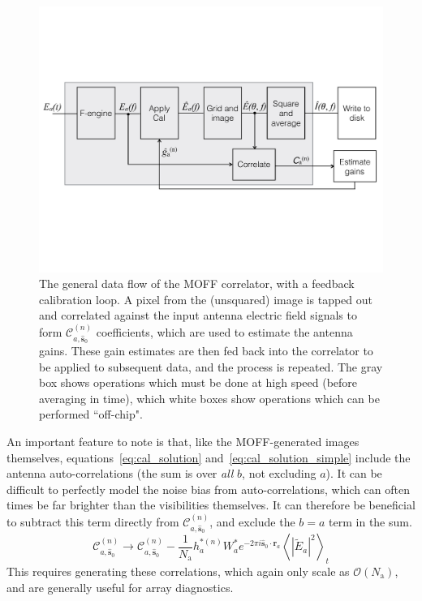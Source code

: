 \documentclass[a4paper,fleqn,usenatbib]{../mnras}
\newcommand{\Nant}{\ensuremath{N_{\mathrm{a}}}}
\newcommand{\spix}{\ensuremath{\hat{\mathbf{s}}_{0}}}
\newcommand{\Cna}[1][n]{\ensuremath{\mathcal{C}^{(#1)}_{a,\spix}}}
\newcommand{\ra}{\ensuremath{\mathbf{r}_a}}
\newcommand{\beamtheta}{\ensuremath{W}}
\newcommand{\Er}[1]{\ensuremath{\widetilde{E}_{#1}}}
\begin{document}
\begin{figure}
\begin{center}
\includegraphics[width=\columnwidth]{figures/schematic.pdf}
\caption{The general data flow of the MOFF correlator, with a feedback calibration loop. A pixel from the (unsquared) image is tapped out and correlated against the input antenna electric field signals to form $\Cna$ coefficients, which are used to estimate the antenna gains. These gain estimates are then fed back into the correlator to be applied to subsequent data, and the process is repeated. The gray box shows operations which must be done at high speed (before averaging in time), which white boxes show operations which can be performed ``off-chip".}
\label{fig:schematic}
\end{center}
\end{figure}

An important feature to note is that, like the MOFF-generated images themselves, equations~\ref{eq:cal_solution} and~\ref{eq:cal_solution_simple} include the antenna auto-correlations (the sum is over \emph{all} $b$, not excluding $a$). It can be difficult to perfectly model the noise bias from auto-correlations, which can often times be far brighter than the visibilities themselves. It can therefore be beneficial to subtract this term directly from \Cna, and exclude the $b=a$ term in the sum.
\begin{equation}
\Cna \rightarrow \Cna - \frac{1}{\Nant} h^{*(n)}_a\beamtheta^*_a e^{-2\pi i \spix \cdot \ra} \left<|\Er{a}|^2\right>_t
\end{equation}
This requires generating these correlations, which again only scale as $\mathcal{O}(\Nant)$, and are generally useful for array diagnostics.
\end{document}
